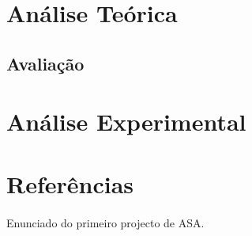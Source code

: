\documentclass[12pt, a4paper]{article}
\begin{document}
\section{Análise Teórica}
\subsection{Avaliação}
\paragraph{}

\section{Análise Experimental}
\paragraph{}

\section{Referências}
\paragraph{}
\indent[1] Enunciado do primeiro projecto de ASA.
\end{document}
